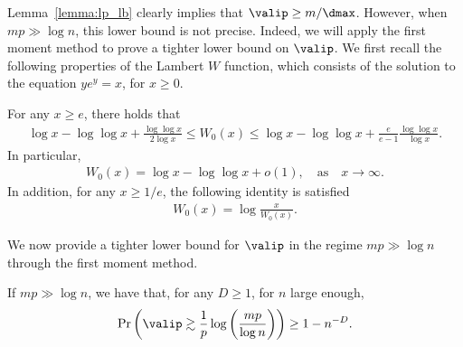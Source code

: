 Lemma~\ref{lemma:lp_lb} clearly implies that \(\valip \geq m / \dmax\). However, when \(mp \gg \log n\), this lower bound is not precise. Indeed, we will apply the first moment method to prove a tighter lower bound on $\valip$. We first recall the following properties of the Lambert \(W\) function, which consists of the solution to the equation $ye^y = x$, for $x \geq 0$. 
\begin{lemma}\label{lambert}
For any $x\geq e$, there holds that
\begin{align}\label{lambert_bounds}
    \log x - \log\log x + \frac{\log \log x}{2\log x}\leq W_0(x) \leq \log x - \log\log x + \frac{e}{e-1}\frac{\log \log x}{\log x}.
\end{align}
In particular,
\begin{align}\label{lambert_asymptotics}
    W_0(x) = \log x - \log \log x + o(1), \quad \text{as} \quad x \rightarrow \infty.
\end{align}
In addition, for any $x \geq 1/e$, the following identity is satisfied
\begin{align}\label{lambert_variational}
    W_0(x) = \log \frac{x}{W_0(x)}.
\end{align}
\end{lemma}
\noindent
We now provide a tighter lower bound for $\valip$ in the regime \(mp \gg \log{n}\) through the first moment method. 
\begin{lemma}
\label{lemma:first_moment_mp_large}
If \(mp \gg \log n\), we have that, for any \(D \geq 1\), for \(n\) large enough, 
\begin{equation*}
        \Pr\left(\valip \gtrsim \frac{1}{p} \log \left(\frac{mp}{\log n}\right)\right) \geq 1 - n^{-D}.
\end{equation*}
\end{lemma}
